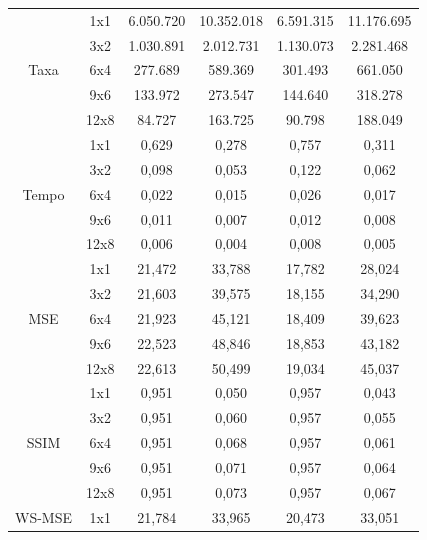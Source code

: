 \begin{longtable}{|c|c|c|c|c|c|}
        \multirow{5}{*}{Taxa}  & 1x1  & 6.050.720 & 10.352.018 & 6.591.315 & 11.176.695 \\ \cline{2-6}
        & 3x2  & 1.030.891 & 2.012.731  & 1.130.073 & 2.281.468 \\ \cline{2-6}
        & 6x4  & 277.689   & 589.369    & 301.493   & 661.050  \\  \cline{2-6}
        & 9x6  & 133.972   & 273.547    & 144.640   & 318.278  \\  \cline{2-6}
        & 12x8 & 84.727    & 163.725    & 90.798    & 188.049  \\   \hline
        \multirow{5}{*}{Tempo} & 1x1  & 0,629     & 0,278      & 0,757     & 0,311     \\  \cline{2-6}
        & 3x2  & 0,098     & 0,053      & 0,122     & 0,062    \\  \cline{2-6}
        & 6x4  & 0,022     & 0,015      & 0,026     & 0,017    \\  \cline{2-6}
        & 9x6  & 0,011     & 0,007      & 0,012     & 0,008    \\  \cline{2-6}
        & 12x8 & 0,006     & 0,004      & 0,008     & 0,005    \\  \hline
        \multirow{5}{*}{MSE}   & 1x1  & 21,472    & 33,788     & 17,782    & 28,024    \\  \cline{2-6}
        & 3x2  & 21,603    & 39,575     & 18,155    & 34,290   \\  \cline{2-6}
        & 6x4  & 21,923    & 45,121     & 18,409    & 39,623   \\  \cline{2-6}
        & 9x6  & 22,523    & 48,846     & 18,853    & 43,182   \\  \cline{2-6}
        & 12x8 & 22,613    & 50,499     & 19,034    & 45,037   \\  \hline
        \multirow{5}{*}{SSIM}  & 1x1  & 0,951     & 0,050      & 0,957     & 0,043     \\  \cline{2-6}
        & 3x2  & 0,951     & 0,060      & 0,957     & 0,055    \\  \cline{2-6}
        & 6x4  & 0,951     & 0,068      & 0,957     & 0,061    \\  \cline{2-6}
        & 9x6  & 0,951     & 0,071      & 0,957     & 0,064    \\  \cline{2-6}
        & 12x8 & 0,951     & 0,073      & 0,957     & 0,067    \\  \hline
        \multirow{5}{*}{WS-MSE}& 1x1  & 21,784    & 33,965     & 20,473    & 33,051   \\  \cline{2-6}

\end{longtable}

